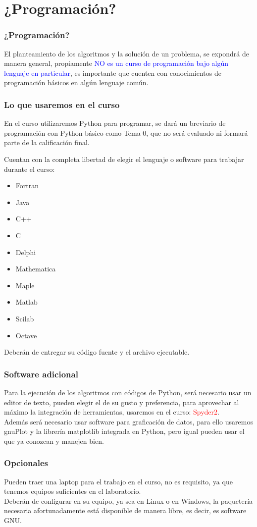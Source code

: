 \documentclass[12pt]{beamer}
\begin{document}
\section{¿Programación?}
\begin{frame}
\frametitle{¿Programación?}
El planteamiento de los algoritmos y la solución de un problema, se expondrá de manera general, propiamente \textcolor{blue}{NO es un curso de programación bajo alg\'{u}n lenguaje en particular}, es importante que cuenten con conocimientos de programación básicos en alg\'{u}n lenguaje com\'{u}n.
\end{frame}
\begin{frame}
\frametitle{Lo que usaremos en el curso}
En el curso utilizaremos Python para programar, se dará un breviario de programación con Python básico como Tema 0, que no será evaluado ni formará parte de la calificación final.
\end{frame}
\begin{frame}
Cuentan con la completa libertad de elegir el lenguaje o software para trabajar durante el curso:
\begin{multicols}{2}
\begin{itemize}
\item Fortran
\item Java
\item C++
\item C
\item Delphi
\item Mathematica
\item Maple
\item Matlab
\item Scilab
\item Octave
\end{itemize}
\end{multicols}
Deberán de entregar su código fuente y el archivo ejecutable.
\end{frame}
\begin{frame}
\frametitle{Software adicional}
Para la ejecución de los algoritmos con códigos de Python, será necesario usar un editor de texto, pueden elegir el de su gusto y preferencia, para aprovechar al máximo la integración de herramientas, usaremos en el curso: \textcolor{red}{Spyder2}.
\\
\bigskip
Además será necesario usar software para graficación de datos, para ello usaremos gnuPlot y la librería matplotlib integrada en Python, pero igual pueden usar el que ya conozcan y manejen bien.
\end{frame}
\begin{frame}
\frametitle{Opcionales}
Pueden traer una laptop para el trabajo en el curso, no es requisito, ya que tenemos equipos suficientes en el laboratorio.
\\
\medskip
Deberán de configurar en su equipo, ya sea en Linux o en Windows, la paquetería necesaria afortunadamente está disponible de manera libre, es decir, es software GNU.
\end{frame}
\end{document}
